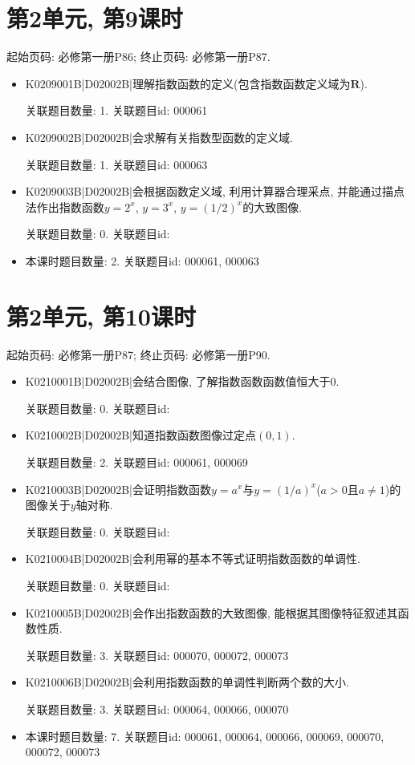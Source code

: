 \section*{第2单元, 第9课时}
起始页码: 必修第一册P86; 终止页码: 必修第一册P87.
\begin{itemize}
\item K0209001B|D02002B|理解指数函数的定义(包含指数函数定义域为$\mathbf{R}$).

关联题目数量: 1. 关联题目id: 000061

\item K0209002B|D02002B|会求解有关指数型函数的定义域.

关联题目数量: 1. 关联题目id: 000063

\item K0209003B|D02002B|会根据函数定义域, 利用计算器合理采点, 并能通过描点法作出指数函数$y=2^{x}$, $y=3^{x}$, $y=(1/2)^{x}$的大致图像.

关联题目数量: 0. 关联题目id: 

\item 本课时题目数量: 2. 关联题目id: 000061, 000063

\end{itemize}

\section*{第2单元, 第10课时}
起始页码: 必修第一册P87; 终止页码: 必修第一册P90.
\begin{itemize}
\item K0210001B|D02002B|会结合图像, 了解指数函数函数值恒大于$0$.

关联题目数量: 0. 关联题目id: 

\item K0210002B|D02002B|知道指数函数图像过定点$(0,1)$.

关联题目数量: 2. 关联题目id: 000061, 000069

\item K0210003B|D02002B|会证明指数函数$y=a^{x}$与$y=(1/a)^{x}$($a>0$且$a\neq1$)的图像关于$y$轴对称.

关联题目数量: 0. 关联题目id: 

\item K0210004B|D02002B|会利用幂的基本不等式证明指数函数的单调性.

关联题目数量: 0. 关联题目id: 

\item K0210005B|D02002B|会作出指数函数的大致图像, 能根据其图像特征叙述其函数性质.

关联题目数量: 3. 关联题目id: 000070, 000072, 000073

\item K0210006B|D02002B|会利用指数函数的单调性判断两个数的大小.

关联题目数量: 3. 关联题目id: 000064, 000066, 000070

\item 本课时题目数量: 7. 关联题目id: 000061, 000064, 000066, 000069, 000070, 000072, 000073

\end{itemize}

